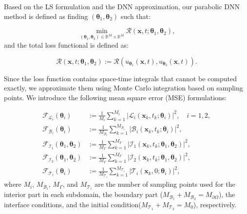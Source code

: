 \documentclass{article}
\begin{document}
Based on the LS formulation and the DNN approximation, our parabolic DNN method is defined as finding $(\boldsymbol{\theta}_1, \boldsymbol{\theta}_2)$ such that:

$$
\min_{(\boldsymbol{\theta}_1, \boldsymbol{\theta}_2) \in \mathbb{R}^M \times \mathbb{R}^M} \mathcal{R}(\boldsymbol{x},t;\boldsymbol{\theta}_1, \boldsymbol{\theta}_2),
$$
and the total loss functional is defined as:

\begin{equation}
    \mathcal{R}(\boldsymbol{x},t;\boldsymbol{\theta}_1, \boldsymbol{\theta}_2) := \mathcal{R}(u_{\boldsymbol{\theta}_1}(\boldsymbol{x},t), u_{\boldsymbol{\theta}_2}(\boldsymbol{x},t)).
\end{equation}

Since the loss function contains space-time integrals that cannot be computed exactly, we approximate them using Monte Carlo integration based on sampling points. We introduce the following mean square error (MSE) formulations:

\begin{equation}
    \begin{aligned}
\mathcal{F}_{\mathcal{L}_i}(\boldsymbol{\theta}_i) &:= \frac{1}{M_{i}} \sum_{k=1}^{M_{i}} |\mathcal{L}_i(\boldsymbol{x}_k,t_k; \boldsymbol{\theta}_i)|^2, \quad i=1,2, \\
\mathcal{F}_{\mathcal{B}_i}(\boldsymbol{\theta}_i) &:= \frac{1}{M_{\mathcal{B}_i}} \sum_{k=1}^{M_{\mathcal{B}_i}} |\mathcal{B}_i(\boldsymbol{x}_k,t_k; \boldsymbol{\theta}_i)|^2, \\
\mathcal{F}_{\mathcal{I}_1}(\boldsymbol{\theta}_1, \boldsymbol{\theta}_2) &:= \frac{1}{M_{\Gamma}} \sum_{k=1}^{M_{\Gamma}} |\mathcal{I}_1(\boldsymbol{x}_k,t_k; \boldsymbol{\theta}_1, \boldsymbol{\theta}_2)|^2, \\
\mathcal{F}_{\mathcal{I}_2}(\boldsymbol{\theta}_1, \boldsymbol{\theta}_2) &:= \frac{1}{M_{\Gamma}} \sum_{k=1}^{M_{\Gamma}} |\mathcal{I}_2(\boldsymbol{x}_k,t_k; \boldsymbol{\theta}_1, \boldsymbol{\theta}_2)|^2, \\
\mathcal{F}_{\mathcal{T}_i}(\boldsymbol{\theta}_i) &:= \frac{1}{M_{\mathcal{T}_i}} \sum_{k=1}^{M_{\mathcal{T}_i}} |\mathcal{T}_i(\boldsymbol{x}_k,0; \boldsymbol{\theta}_i)|^2,
\end{aligned}
\end{equation}
where $M_{i}$, $M_{\mathcal{B}_i}$, $M_{\Gamma}$, and $M_{\mathcal{T}_i}$ are the number of sampling points used for the interior part in each subdomain, the boundary part ($M_{\mathcal{B}_1} + M_{\mathcal{B}_2} = M_{\partial \Omega}$), the interface conditions, and the initial condition($M_{\mathcal{T}_1} + M_{\mathcal{T}_2} = M_{0}$), respectively.
\end{document}
